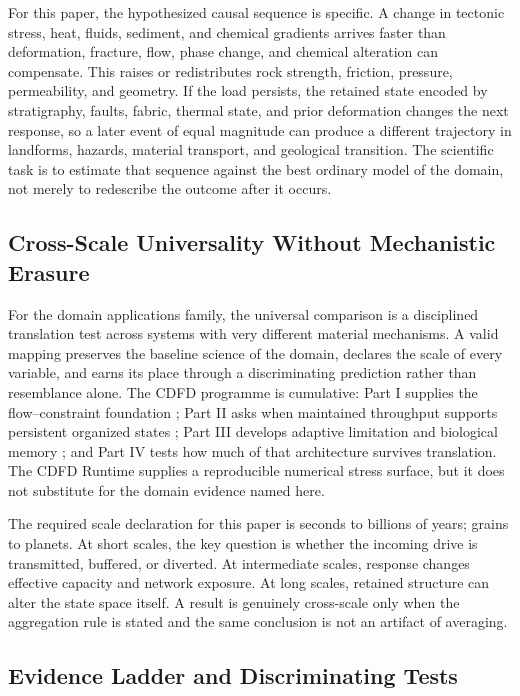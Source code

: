 \documentclass[11pt]{article}
\begin{document}
For this paper, the hypothesized causal sequence is specific. A change in
tectonic stress, heat, fluids, sediment, and chemical gradients arrives faster than deformation, fracture, flow, phase change, and chemical alteration can compensate.
This raises or redistributes rock strength, friction, pressure, permeability, and geometry. If the load persists,
the retained state encoded by stratigraphy, faults, fabric, thermal state, and prior deformation changes the next response, so a later event of equal
magnitude can produce a different trajectory in landforms, hazards, material transport, and geological transition. The
scientific task is to estimate that sequence against the best ordinary model of
the domain, not merely to redescribe the outcome after it occurs.

\subsection{Cross-Scale Universality Without Mechanistic Erasure}

For the domain applications family, the universal comparison is a disciplined translation test across systems with very different material mechanisms. A valid mapping preserves the baseline science of the domain, declares the scale of every variable, and earns its place through a discriminating prediction rather than resemblance alone. \cite{Holling1973,Turing1952,Shannon1948,BakTangWiesenfeld1987}
The CDFD programme is cumulative: Part I supplies the flow--constraint
foundation \cite{MujjabiPartI2026}; Part II asks when maintained throughput
supports persistent organized states \cite{MujjabiPartII2026}; Part III
develops adaptive limitation and biological memory \cite{MujjabiPartIII2026};
and Part IV \cite{MujjabiPartIV2026} tests how much of that architecture
survives translation. The CDFD Runtime \cite{CDFDRuntime2026} supplies a
reproducible numerical stress surface, but it does not substitute for the
domain evidence named here.

The required scale declaration for this paper is seconds to billions of years; grains to planets. At short
scales, the key question is whether the incoming drive is transmitted,
buffered, or diverted. At intermediate scales, response changes effective
capacity and network exposure. At long scales, retained structure can alter the
state space itself. A result is genuinely cross-scale only when the aggregation
rule is stated and the same conclusion is not an artifact of averaging.

\subsection{Evidence Ladder and Discriminating Tests}
\end{document}
